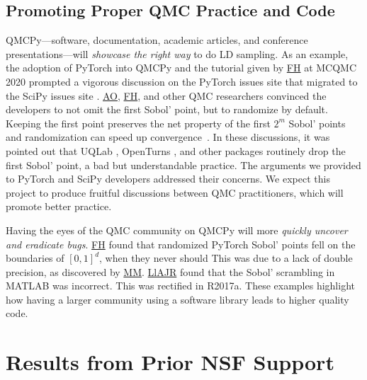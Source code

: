 \documentclass[11pt]{NSFamsart}
\newcommand{\FH}{\hyperlink{FHlink}{FH}\xspace}
\newcommand{\AO}{\hyperlink{AOlink}{AO}\xspace}
\newcommand{\MM}{\hyperlink{MMlink}{MM}\xspace}
\newcommand{\LlAJR}{\hyperlink{LlAJRlink}{LlAJR}\xspace}
\newcommand{\SciPy}{SciPy\xspace}
\newcommand{\MATLAB}{MATLAB\xspace}
\newcommand{\PyTorch}{PyTorch\xspace}
\begin{document}
\subsection{Promoting Proper QMC Practice and Code} \label{sec:goodpractice}
QMCPy---software, documentation, academic articles, and conference presentations---will \emph{showcase the right way} to do LD sampling.  As an example, the adoption of \PyTorch into QMCPy and the tutorial given by \FH at MCQMC 2020 \cite{MCQMC2020QMCPyTut, ChoEtal22a} prompted a vigorous discussion on the \PyTorch issues site \cite{PyTorchFirstPt2020a} that migrated to the \SciPy issues site \cite{scipySobol2020a}.  \AO, \FH, and other QMC researchers convinced the developers to not omit the first Sobol' point, but to randomize by default.  Keeping the first point preserves the net property of the first $2^m$ Sobol' points and randomization can speed up convergence~\cite{owen2020dropping}. In these discussions, it was pointed out that UQLab \cite{UQLab2014}, OpenTurns \cite{OpenTURNS}, and other packages routinely drop the first Sobol' point, a bad but understandable practice.  The arguments we provided to \PyTorch and \SciPy developers addressed their concerns.  We expect this project to produce fruitful discussions between QMC practitioners, which will promote better practice.

Having the eyes of the QMC community on QMCPy will more \emph{quickly uncover and eradicate bugs}.  \FH found  that randomized \PyTorch Sobol' points fell on the boundaries of $[0,1]^d$, when they never should \cite{PyTorchFirstPt2020a} This was due to a lack of double precision, as discovered by \MM.  \LlAJR found that the Sobol' scrambling in \MATLAB was incorrect.  This was rectified in R2017a.  These examples highlight how having a larger community using a software library leads to higher quality code.


\section{Results from Prior NSF Support} \label{sec:prior_work}
\end{document}
